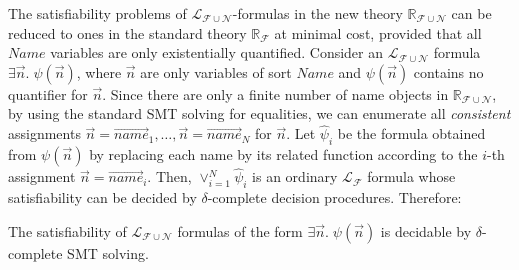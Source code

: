 The satisfiability problems of $\mathcal{L}_{\mathcal{F}\cup\mathcal{N}}$-formulas in the new theory 
$\mathbb{R}_{\mathcal{F}\cup\mathcal{N}}$
can be reduced to ones in the standard theory $\mathbb{R}_\mathcal{F}$ at minimal cost,
provided that all $\mathit{Name}$ variables %
are only existentially quantified.
Consider an $\mathcal{L}_{\mathcal{F}\cup\mathcal{N}}$ formula 
$\exists \vec{n}.\; \psi(\vec{n})$, where 
$\vec{n}$ are only variables of sort $\mathit{Name}$ %
and
$\psi(\vec{n})$ contains no quantifier for $\vec{n}$.
Since there are only a finite number of name objects in $\mathbb{R}_{\mathcal{F}\cup\mathcal{N}}$,
by using the standard SMT solving for equalities,
we can enumerate all \emph{consistent} assignments 
$\vec{n} = \overrightarrow{\mathit{name}}_1,\ldots,\vec{n} = \overrightarrow{\mathit{name}}_N$ for $\vec{n}$.
Let $\hat{\psi}_i$ be the formula obtained from $\psi(\vec{n})$
by replacing each name by its related function according to the $i$-th assignment $\vec{n} = \overrightarrow{\mathit{name}}_i$.
Then, $\vee_{i=1}^N \hat{\psi}_i$ is an ordinary $\mathcal{L}_\mathcal{F}$ formula
whose satisfiability can be decided by %
$\delta$-complete decision procedures. Therefore:


\begin{theorem}\label{thm:new-dec}
The satisfiability of $\mathcal{L}_{\mathcal{F}\cup\mathcal{N}}$ formulas of the form $\exists \vec{n}.\; \psi(\vec{n})$
is decidable by  $\delta$-complete SMT solving. 
\end{theorem}









